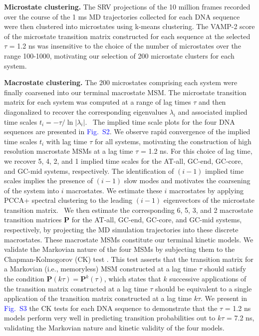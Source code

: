 \documentclass[journal=jpcbfk,manuscript=article]{achemso}
\newcommand*{\blauw}[1]{\textcolor{blue}{#1}}
\begin{document}
\textbf{Microstate clustering.} The SRV projections of the 10 million frames recorded over the course of the 1 ms MD trajectories collected for each DNA sequence were then clustered into microstates using k-means clustering. The VAMP-2 score of the microstate transition matrix constructed for each sequence at the selected $\tau$ = 1.2 ns was insensitive to the choice of the number of microstates over the range 100-1000, motivating our selection of 200 microstate clusters for each system.

\textbf{Macrostate clustering.} The 200 microstates comprising each system were finally coarsened into our terminal macrostate MSM. The microstate transition matrix for each system was computed at a range of lag times $\tau$ and then diagonalized to recover the corresponding eigenvalues $\lambda_i$ and associated implied time scales $t_i = -\tau / \ln \left| \lambda_i \right|$.~\citep{Wehmeyer2019IntroductionV1.0} The implied time scale plots for the four DNA sequences are presented in \blauw{Fig.~S2}. We observe rapid convergence of the implied time scales $t_i$ with lag time $\tau$ for all systems, motivating the construction of high resolution macrostate MSMs at a lag time $\tau$ = 1.2 ns. For this choice of lag time, we recover 5, 4, 2, and 1 implied time scales for the AT-all, GC-end, GC-core, and GC-mid systems, respectively. The identification of $(i-1)$ implied time scales implies the presence of $(i-1)$ slow modes and motivates the coarsening of the system into $i$ macrostates. We estimate these $i$ macrostates by applying PCCA+ spectral clustering to the leading $(i-1)$ eigenvectors of the microstate transition matrix.~\citep{Roblitz2013FuzzyClassification, Weber2018ImplicationsSimulation, Kube2007AConformations} We then estimate the corresponding 6, 5, 3, and 2 macrostate transition matrices $\mathbf{P}$ for the AT-all, GC-end, GC-core, and GC-mid systems, respectively, by projecting the MD simulation trajectories into these discrete macrostates. These macrostate MSMs constitute our terminal kinetic models. We validate the Markovian nature of the four MSMs by subjecting them to the Chapman-Kolmogorov (CK) test \citep{Noe2009ConstructingSimulations,Phys2011MarkovValidation,  Wehmeyer2019IntroductionV1.0}. This test asserts that the transition matrix for a Markovian (i.e., memoryless) MSM constructed at a lag time $\tau$ should satisfy the condition $\mathbf{P}(k \tau) = \mathbf{P}^k(\tau)$, which states that $k$ successive applications of the transition matrix constructed at a lag time $\tau$ should be equivalent to a single application of the transition matrix constructed at a lag time $k \tau$. We present in \blauw{Fig.~S3} the CK tests for each DNA sequence to demonstrate that the $\tau$ = 1.2 ns models perform very well in predicting transition probabilities out to $k \tau$ = 7.2 ns, validating the Markovian nature and kinetic validity of the four models.
\end{document}
